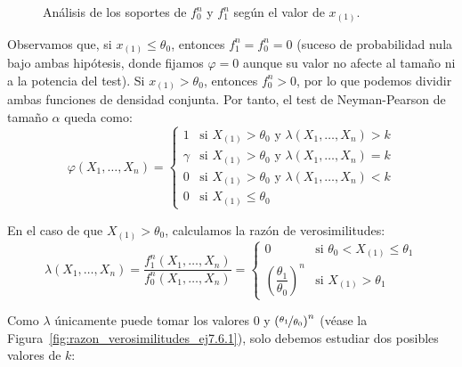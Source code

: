 \begin{ejercicio}
\begin{description}
\begin{figure}[h]
            \caption{Análisis de los soportes de $f_0^n$ y $f_1^n$ según el valor de $x_{(1)}$.}
            \label{fig:densidades_conjuntas_ej7.6.1}
        \end{figure}

        Observamos que, si $x_{(1)} \leq \theta_0$, entonces $f_1^n = f_0^n = 0$ (suceso de probabilidad nula bajo ambas hipótesis, donde fijamos $\varphi = 0$ aunque su valor no afecte al tamaño ni a la potencia del test). Si $x_{(1)} > \theta_0$, entonces $f_0^n > 0$, por lo que podemos dividir ambas funciones de densidad conjunta. Por tanto, el test de Neyman-Pearson de tamaño $\alpha$ queda como:
        \begin{equation*}
            \varphi(X_1, \ldots, X_n) = \left\{\begin{array}{ll}
                1 & \text{si\ } X_{(1)} > \theta_0 \text{\ y\ } \lambda(X_1, \ldots, X_n) > k \\
                \gamma & \text{si\ } X_{(1)} > \theta_0 \text{\ y\ } \lambda(X_1, \ldots, X_n) = k \\
                0 & \text{si\ } X_{(1)} > \theta_0 \text{\ y\ } \lambda(X_1, \ldots, X_n) < k \\
                0 & \text{si\ } X_{(1)} \leq \theta_0
            \end{array}\right.
        \end{equation*}

        En el caso de que $X_{(1)} > \theta_0$, calculamos la razón de verosimilitudes:
        \begin{equation*}
            \lambda(X_1, \ldots, X_n) = \frac{f_1^n(X_1, \ldots, X_n)}{f_0^n(X_1, \ldots, X_n)} = \begin{cases}
                0 & \text{si\ } \theta_0 < X_{(1)} \leq \theta_1 \\
                \left(\dfrac{\theta_1}{\theta_0}\right)^n & \text{si\ } X_{(1)} > \theta_1
            \end{cases}
        \end{equation*}

        Como $\lambda$ únicamente puede tomar los valores $0$ y $\left(\nicefrac{\theta_1}{\theta_0}\right)^n$ (véase la Figura~\ref{fig:razon_verosimilitudes_ej7.6.1}), solo debemos estudiar dos posibles valores de $k$:
        \begin{figure}[h]
            \centering
\end{figure}
\end{description}
\end{ejercicio}
